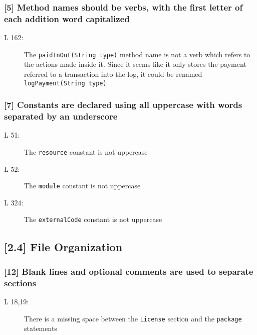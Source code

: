 \subsubsection*{[5] Method names should be verbs, with the first letter of each addition word capitalized}
\begin{description}
	\item[L 162:] The {\tt paidInOut(String type)} method name is not a verb which refers to the actions made inside it. Since it seems like it only stores the payment referred to a transaction into the log, it could be renamed {\tt logPayment(String type)}
\end{description}

\subsubsection*{[7] Constants are declared using all uppercase with words separated by an underscore}
\begin{description}
	\item[L 51:] The {\tt resource} constant is not uppercase
	\item[L 52:] The {\tt module} constant is not uppercase
	\item[L 324:] The {\tt externalCode} constant is not uppercase
\end{description}

\subsection*{[2.4] File Organization}

\subsubsection*{[12] Blank lines and optional comments are used to separate sections}
\begin{description}
	\item[L 18,19:] There is a missing space between the {\tt License} section and the {\tt package} statements
\end{description}

